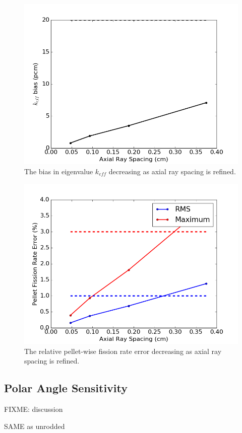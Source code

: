 \begin{figure}[h!]
	\centering
	\includegraphics[width=0.7\linewidth]{figures/results/sensitivity/rodded_z_spacing_pcm.png}
	\caption[]{The bias in eigenvalue $k_{\textit{eff}}$ decreasing as axial ray spacing is refined.}
	\label{fig:rodded-axial-rs-pcm}
\end{figure}
\begin{figure}[h!]
	\centering
	\includegraphics[width=0.7\linewidth]{figures/results/sensitivity/rodded_z_spacing_fr.png}
	\caption[]{The relative pellet-wise fission rate error decreasing as axial ray spacing is refined.}
	\label{fig:rodded-axial-rs-fr}
\end{figure}

\subsection{Polar Angle Sensitivity}

FIXME: discussion

SAME as unrodded

